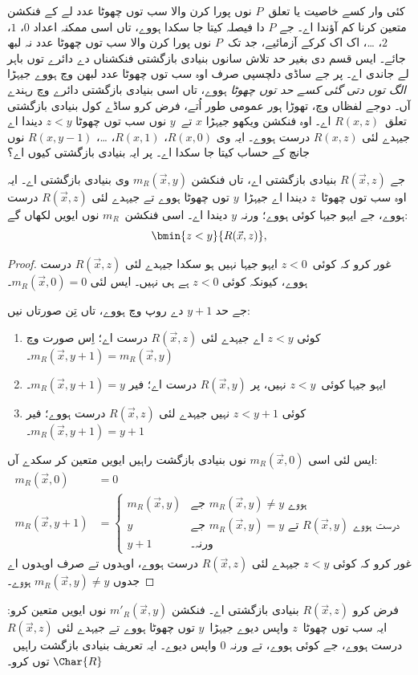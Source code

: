 \documentclass[../../../include/open-logic-section]{subfiles}
\begin{document}

\begin{explain}
کئی وار کسے خاصیت یا تعلق~$P$
نوں پورا کرن والا سب توں چھوٹا
عدد لے کے فنکشن متعین کرنا کم
آؤندا اے۔ جے $P$ دا فیصلہ
کیتا جا سکدا ہووے، تاں اسی
ممکنہ اعداد $0$، $1$،
$2$، \dots، اک اک کرکے
آزمائیے، جد تک~$P$ نوں
پورا کرن والا سب توں چھوٹا
عدد نہ لبھ جائے۔ ایس قسم دی
بغیر حد تلاش سانوں بنیادی
بازگشتی فنکشناں دے دائرے توں
باہر لے جاندی اے۔ پر جے ساڈی
دلچسپی صرف اوہ سب توں چھوٹا
عدد لبھن وچ ہووے جیہڑا
\emph{الگ توں دتی گئی کسے حد توں چھوٹا}
ہووے، تاں اسی بنیادی بازگشتی
دائرے وچ رہندے آں۔ دوجے لفظاں
وچ، تھوڑا ہور عمومی طور اُتے،
فرض کرو ساڈے کول بنیادی
بازگشتی تعلق~$R(x,z)$ اے۔
اوہ فنکشن ویکھو جیہڑا
$x$ تے~$y$ نوں سب توں
چھوٹا $z < y$ دیندا اے جیہدے
لئی $R(x, z)$ درست ہووے۔
ایہ وی $R(x, 0)$،
$R(x, 1)$، \dots،
$R(x, y-1)$ نوں جانچ کے
حساب کیتا جا سکدا اے۔
پر ایہ بنیادی بازگشتی کیوں اے؟
\end{explain}

\begin{prop}
جے $R(\vec x, z)$ بنیادی
بازگشتی اے، تاں فنکشن
$m_R(\vec{x}, y)$ وی بنیادی
بازگشتی اے۔ ایہ اوہ سب
توں چھوٹا~$z$ دیندا اے
جیہڑا~$y$ توں چھوٹا ہووے
تے جیہدے لئی $R(\vec x, z)$
درست ہووے، جے ایہو جیہا
کوئی ہووے؛ ورنہ $y$ دیندا
اے۔ اسی فنکشن~$m_R$ نوں
ایویں لکھاں گے:
\[
\bmin{z < y}{R(\vec{x}, z)},
\]
\end{prop}

\begin{proof}
غور کرو کہ کوئی~$z < 0$
ایہو جیہا نہیں ہو سکدا
جیہدے لئی $R(\vec{x}, z)$
درست ہووے، کیونکہ کوئی
$z < 0$ ہے ہی نہیں۔
ایس لئی $m_R(\vec x, 0) = 0$۔

جے حد $y + 1$ دے روپ
وچ ہووے، تاں تِن صورتاں نیں:
\begin{enumerate}
\item کوئی $z < y$ اے جیہدے
لئی $R(\vec{x}, z)$ درست
اے؛ اِس صورت وچ
$m_R(\vec{x}, y+1) = m_R(\vec{x}, y)$۔
\item ایہو جیہا کوئی~$z<y$
نہیں، پر $R(\vec{x}, y)$
درست اے؛ فیر
$m_R(\vec{x}, y+1) = y$۔
\item کوئی $z < y+1$ نہیں
جیہدے لئی $R(\vec{x}, z)$
درست ہووے؛ فیر
$m_R(\vec{x}, y+1) = y+1$۔
\end{enumerate}
ایس لئی اسی $m_R(\vec x, 0)$
نوں بنیادی بازگشت راہیں
ایویں متعین کر سکدے آں:
\begin{align*}
m_R(\vec{x}, 0) & = 0\\
m_R(\vec{x}, y+1) & =
\begin{cases}
m_R(\vec{x}, y) & \text{جے $m_R(\vec x, y) \neq y$ ہووے}\\
y & \text{جے $m_R(\vec x, y) = y$ تے $R(\vec{x}, y)$ درست ہووے}\\
y+1 & \text{ورنہ۔}
\end{cases}
\end{align*}
غور کرو کہ کوئی $z<y$
جیہدے لئی $R(\vec x, z)$
درست ہووے، اوہدوں تے
صرف اوہدوں اے جدوں
$m_R(\vec x,
y) \neq y$ ہووے۔
\end{proof}

\begin{prob}
فرض کرو $R(\vec x, z)$
بنیادی بازگشتی اے۔ فنکشن
$m'_R(\vec{x}, y)$ نوں
ایویں متعین کرو: ایہ سب
توں چھوٹا~$z$ واپس دیوے
جیہڑا~$y$ توں چھوٹا ہووے
تے جیہدے لئی $R(\vec{x}, z)$
درست ہووے، جے کوئی ہووے،
تے ورنہ $0$ واپس دیوے۔
ایہ تعریف بنیادی بازگشت
راہیں~$\Char{R}$ توں کرو۔
\end{prob}
\end{document}
